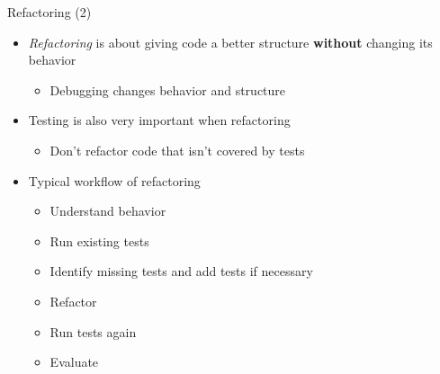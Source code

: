 \documentclass[
ps,
]{prosper}
\begin{document}
\begin{slide}{Refactoring (2)}

\begin{itemize}

\item \emph{Refactoring} is about giving code a better structure
  \textbf{without} changing its behavior

  \begin{itemize}
    
  \item Debugging changes behavior and structure
    
  \end{itemize}
  
\item Testing is also very important when refactoring

  \begin{itemize}
    
  \item Don't refactor code that isn't covered by tests
    
  \end{itemize}

\item Typical workflow of refactoring
  
  \begin{itemize}
    
  \item Understand behavior

  \item Run existing tests

  \item Identify missing tests and add tests if necessary

  \item Refactor

  \item Run tests again

  \item Evaluate
    
  \end{itemize}

\end{itemize}
  
\end{slide}
\end{document}

